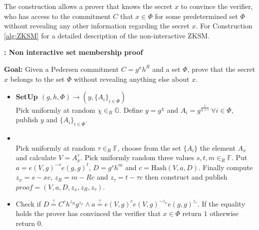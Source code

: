 The construction allows a prover that knows the secret $x$ to convince the verifier, who has access to the commitment $C$ that $x\in\Phi$ for some predetermined set $\Phi$ without revealing any other information regarding the secret $x$.  For Construction \ref{alg:ZKSM} for a detailed description of the non-interactive ZKSM.
\begin{algorithm}[]
\caption{\textbf{: Non interactive set membership proof}}
\textbf{Goal:} Given a Pedersen commitment $C=g^x h^R$ and a set $\Phi$, prove that the secret $x$ belongs to the set $\Phi$ without revealing anything else about $x$.
\vspace{2pt} \hline \vspace{2pt}
\begin{itemize}
  \item\textbf{SetUp $(g,h,\Phi)\xrightarrow[]{}(y,\{A_{i}\}_{i\in\Phi})$}\\
Pick uniformly at random $\chi\in_R\mathds{G}$. Define $y=g^\chi$ and $A_i=g^{\frac{1}{\chi+i}} \:\forall i\in\Phi$, publish $y$ and $\{A_i\}_{i\in\Phi}$.

\item{}\\
Pick uniformly at random $\tau\in_R\mathds{F}$, choose from the set $\{A_i\}$ the element $A_x$ and calculate $V=A_x^\tau$. Pick uniformly random three values $s,t,m\in_R\mathds{F}$. Put $a=e(V,g)^{-s}e(g,g)^t$, $D=g^sh^m$ and $c=\text{Hash}(V,a,D)$. Finally compute $z_x = s-x c$, $z_R = m-Rc$ and $z_\tau= t-\tau c$ then construct and publish $\textit{proof} = (V,a,D,z_x,z_R,z_\tau)$.

\item{}
Check if $D\overset{?}{=}C^ch^{z_R}g^{z_x}\wedge a \overset{?}{=} e(V,g)^c e(V,g)^{-z_x}e(g,g)^{z_\tau}$. If the equality holds the prover has convinced the verifier that $x\in\Phi$ return $1$ otherwise return $0$.
\end{itemize}
\label{alg:ZKSM}
\end{algorithm}

